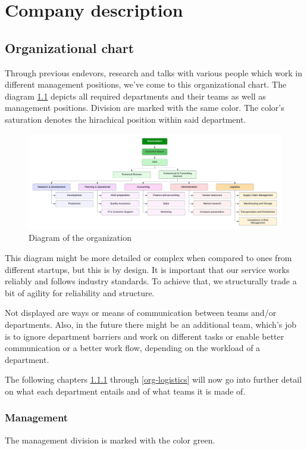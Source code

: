 \chapter{Company description}
\section{Organizational chart}
Through previous endevors, research and talks with various people which work in different management positions, we've come to this organizational chart. The diagram \ref{fig:organisational-chart} depicts all required departments and their teams as well as management positions. Division are marked with the same color. The color's saturation denotes the hirachical position within said department.

\begin{figure}[!ht]
  \centering
  \includegraphics[width=\linewidth]{./images/organisational-chart.png}
  \caption[Organizational chart made with lucidchart.com]{Diagram of the organization}
  \label{fig:organisational-chart}
\end{figure}

This diagram might be more detailed or complex when compared to ones from different startups, but this is by design. It is important that our service works reliably and follows industry standards. To achieve that, we structurally trade a bit of agility for reliability and structure.

Not displayed are ways or means of communication between teams and/or departments. Also, in the future there might be an additional team, which's job is to ignore department barriers and work on different tasks or enable better communication or a better work flow, depending on the workload of a department.

The following chapters \ref{org-management} through \ref{org-logistics} will now go into further detail on what each department entails and of what teams it is made of.
\subsection{Management}\label{org-management}
The management division is marked with the color green.
